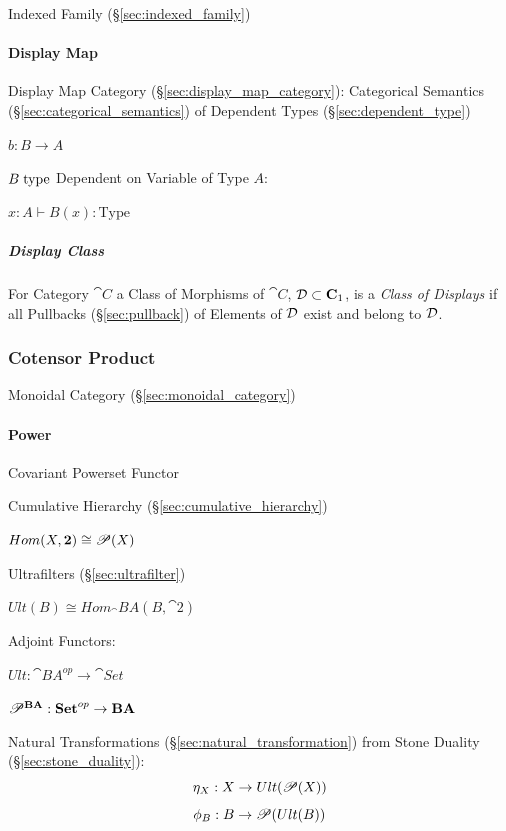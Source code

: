 Indexed Family (\S\ref{sec:indexed_family})



\paragraph{Display Map}\label{sec:display_map}\hfill

Display Map Category (\S\ref{sec:display_map_category}): Categorical
Semantics (\S\ref{sec:categorical_semantics}) of Dependent Types
(\S\ref{sec:dependent_type})

$b : B \rightarrow A$

$B \;\mathrm{type}$ Dependent on Variable of Type $A$:

$x:A \vdash B(x):\mathrm{Type}$



\subparagraph{Display Class}\label{sec:display_class}\hfill

For Category $\cat{C}$ a Class of Morphisms of $\cat{C}$, $\mathcal{D}
\subset \mathbf{C}_1$, is a \emph{Class of Displays} if all Pullbacks
(\S\ref{sec:pullback}) of Elements of $\mathcal{D}$ exist and belong to
$\mathcal{D}$.



\subsubsection{Cotensor Product}\label{sec:cotensor_product}

Monoidal Category (\S\ref{sec:monoidal_category})



\paragraph{Power}\label{sec:power}\hfill

Covariant Powerset Functor %

Cumulative Hierarchy (\S\ref{sec:cumulative_hierarchy})

$Hom(X,\mathbf{2}) \cong \mathscr{P}(X)$

Ultrafilters (\S\ref{sec:ultrafilter})

$Ult(B) \cong Hom_\cat{BA}(B,\cat{2})$

Adjoint Functors:

$Ult : \cat{BA}^{op} \rightarrow \cat{Set}$

$\mathscr{P}^\mathbf{BA} : \mathbf{Set}^{op} \rightarrow \mathbf{BA}$

Natural Transformations (\S\ref{sec:natural_transformation}) from
Stone Duality (\S\ref{sec:stone_duality}):
\[
  \eta_X : X \rightarrow Ult(\mathscr{P}(X))
\]\[
  \phi_B : B \rightarrow \mathscr{P}(Ult(B))
\]

